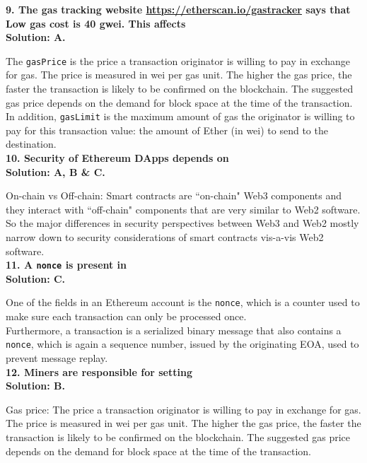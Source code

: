 \textbf{9. The gas tracking website \url{https://etherscan.io/gastracker} says that Low gas cost is 40 gwei.
This affects}\label{sec:exam1_q9}\\

\textbf{Solution: A.}

The \verb|gasPrice| is the price a transaction originator is willing to pay in exchange for gas.
The price is measured in wei per gas unit.
The higher the gas price, the faster the transaction is likely to be confirmed on the blockchain.
The suggested gas price depends on the demand for block space at the time of the transaction.\\

In addition, \verb|gasLimit| is the maximum amount of gas the originator is willing to pay for this transaction value: the amount of Ether (in wei) to send to the destination.\\

\textbf{10. Security of Ethereum DApps depends on}\label{sec:exam1_q10}\\

\textbf{Solution: A, B \& C.}

On-chain vs Off-chain: Smart contracts are ``on-chain" Web3 components and they interact with ``off-chain" components that are very similar to Web2 software.
So the major differences in security perspectives between Web3 and Web2 mostly narrow down to security considerations of smart contracts vis-a-vis Web2 software.\\

\textbf{11. A \texttt{nonce} is present in}\label{sec:exam1_q11}\\

\textbf{Solution: C.}

One of the fields in an Ethereum account is the \verb|nonce|, which is a counter used to make sure each transaction can only be processed once.\\

Furthermore, a transaction is a serialized binary message that also contains a \verb|nonce|, which is again a sequence number, issued by the originating EOA, used to prevent message replay.\\

\textbf{12. Miners are responsible for setting}\label{sec:exam1_q12}\\

\textbf{Solution: B.}

Gas price: The price a transaction originator is willing to pay in exchange for gas.
The price is measured in wei per gas unit.
The higher the gas price, the faster the transaction is likely to be confirmed on the blockchain.
The suggested gas price depends on the demand for block space at the time of the transaction.\\

